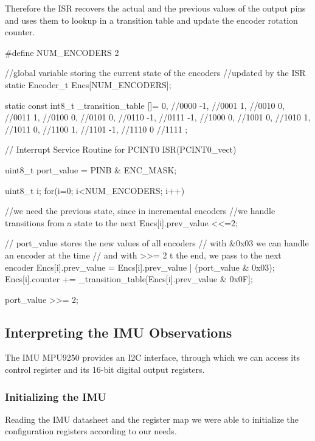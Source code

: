 Therefore the ISR recovers the actual and the previous values of the output pins and uses them to lookup in a transition table and update the encoder rotation counter.
\begin{ccode}
	#define NUM_ENCODERS 2
	
		//global variable storing the current state of the encoders
			//updated by the ISR
	static Encoder_t Encs[NUM_ENCODERS];
	
	static const int8_t _transition_table []= {
			0,	//0000
		 -1,	//0001
			1,	//0010
			0,	//0011
			1,	//0100
			0,	//0101
			0,	//0110
		 -1,	//0111
		 -1,	//1000
			0,	//1001
			0,	//1010
			1,	//1011
			0,	//1100
			1,	//1101
		 -1,	//1110
			0		//1111
	};

	// Interrupt Service Routine for PCINT0
	ISR(PCINT0_vect) {
		uint8_t port_value = PINB & ENC_MASK;
	
		uint8_t i;
		for(i=0; i<NUM_ENCODERS; i++){
				//we need the previous state, since in incremental encoders
					//we handle transitions from a state to the next
			Encs[i].prev_value <<=2;
			
				// port_value stores the new values of all encoders
					// with &0x03 we can handle an encoder at the time
					// and with >>= 2 t the end, we pass to the next encoder
			Encs[i].prev_value = Encs[i].prev_value | (port_value & 0x03);
			Encs[i].counter += _transition_table[Encs[i].prev_value & 0x0F];
		
			port_value >>= 2;
		}
	}
\end{ccode}


\subsection{Interpreting the IMU Observations}\label{imu_calib}

The IMU MPU9250 provides an I2C interface, through which we can access its control register and its 16-bit digital output registers\supercite{imu_prod_spec}.\\

\subsubsection{Initializing the IMU}

Reading the IMU datasheet\supercite{imu_prod_spec} and the register map\supercite{imu_regs} we were able to initialize the configuration registers according to our needs.\\

